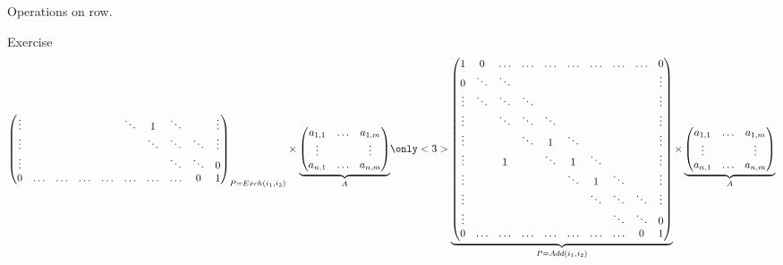 \documentclass{beamer}
\begin{document}
\begin{frame}{Operations on row.}
\begin{block}{Exercise}
\[{{\begin{pmatrix}
            \vdots & &  &  & & \ddots & 1 & \ddots & & \vdots\\
            \vdots &   &   &   &   &   & \ddots & \ddots & \ddots   & \vdots\\
            \vdots &   &   &  &   &    &  & \ddots  & \ddots & 0\\
            0 & \dots & \dots & \dots & \dots & \dots & \dots & \dots  & 0 & 1\\
      \end{pmatrix}}_{P = Exch(i_1, i_2)} \times \underbrace{\begin{pmatrix} a_{1,1} & \dots & a_{1,m}\\ \vdots & & \vdots\\ a_{n,1} & \dots & a_{n, m} \end{pmatrix}}_{A}
      }
      \only<3>{
        \underbrace{
          \begin{pmatrix}
            1 & 0 & \dots & \dots & \dots & \dots & \dots & \dots & \dots & 0 \\
            0 & \ddots & \ddots &  &  & & & & & \vdots \\
            \vdots & \ddots & \ddots & \ddots &    &   &  &  &  & \vdots\\
            \vdots &   & \ddots & \ddots & \ddots   &  &   &   &   & \vdots\\
            \vdots &  &  & \ddots & 1 & \ddots &  &   &  & \vdots\\
            \vdots &  & 1 &  & \ddots & 1 & \ddots &  & & \vdots\\
            \vdots & &  &  & & \ddots & 1 & \ddots & & \vdots\\
            \vdots &   &   &   &   &   & \ddots & \ddots & \ddots   & \vdots\\
            \vdots &   &   &  &   &    &  & \ddots  & \ddots & 0\\
            0 & \dots & \dots & \dots & \dots & \dots & \dots & \dots  & 0 & 1\\
      \end{pmatrix}}_{P = Add(i_1, i_2)} \times \underbrace{\begin{pmatrix} a_{1,1} & \dots & a_{1,m}\\ \vdots & & \vdots\\ a_{n,1} & \dots & a_{n, m} \end{pmatrix}}_{A}
}
      \]
    \end{block}
    
  \end{frame}
\end{document}
